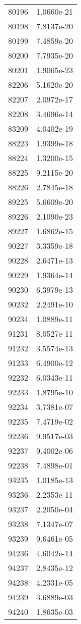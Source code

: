 \begin{table}[h!]
\begin{tabular}{|| c || c |}
80196 & 1.0660e-21 \\
80198 & 7.8137e-20 \\
80199 & 7.4859e-20 \\
80200 & 7.7935e-20 \\
80201 & 1.9065e-23 \\
82206 & 5.1620e-20 \\
82207 & 2.0972e-17 \\
82208 & 3.4696e-14 \\
83209 & 4.0402e-19 \\
88223 & 1.9399e-18 \\
88224 & 1.3200e-15 \\
88225 & 9.2115e-20 \\
88226 & 2.7845e-18 \\
89225 & 5.6609e-20 \\
89226 & 2.1090e-23 \\
89227 & 1.6862e-15 \\
90227 & 3.3359e-18 \\
90228 & 2.6471e-13 \\
90229 & 1.9364e-14 \\
90230 & 6.3979e-13 \\
90232 & 2.2491e-10 \\
90234 & 1.0889e-11 \\
91231 & 8.0527e-11 \\
91232 & 3.5574e-13 \\
91233 & 6.4900e-12 \\
92232 & 6.0343e-11 \\
92233 & 1.8795e-10 \\
92234 & 3.7381e-07 \\
92235 & 7.4719e-02 \\
92236 & 9.9517e-03 \\
92237 & 9.4002e-06 \\
92238 & 7.4898e-01 \\
93235 & 1.0185e-13 \\
93236 & 2.2353e-11 \\
93237 & 2.2050e-04 \\
93238 & 7.1347e-07 \\
93239 & 9.6461e-05 \\
94236 & 4.6042e-14 \\
94237 & 2.8435e-12 \\
94238 & 4.2331e-05 \\
94239 & 3.6889e-03 \\
94240 & 1.8635e-03 \\

\end{tabular}
\end{table}
